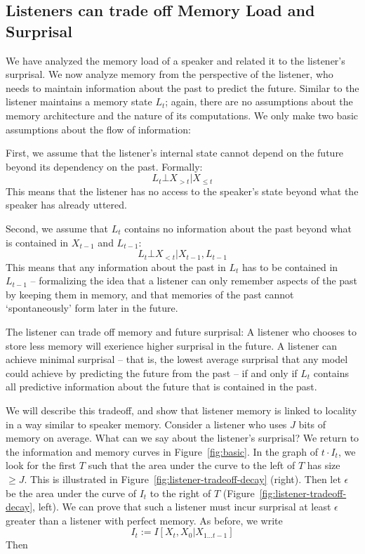 \documentclass[11pt,letterpaper]{article}
\begin{document}
\subsection{Listeners can trade off Memory Load and Surprisal}\label{sec:listener}


We have analyzed the memory load of a speaker and related it to the listener's surprisal.
We now analyze memory from the perspective of the listener, who needs to maintain information about the past to predict the future.
Similar to the listener maintains a memory state $L_t$; again, there are no assumptions about the memory architecture and the nature of its computations.
We only make two basic assumptions about the flow of information:

First, we assume that the listener's internal state cannot depend on the future beyond its dependency on the past.
Formally: 
\begin{equation}\label{eq:listener-markov-1}
L_t \bot X_{>t} | X_{\leq t}
\end{equation}
This means that the listener has no access to the speaker's state beyond what the speaker has already uttered.

Second, we assume that $L_t$ contains no information about the past beyond what is contained in $X_{t-1}$ and $L_{t-1}$:
\begin{equation}\label{eq:listener-markov-2}
L_t \bot X_{<t} | X_{t-1}, L_{t-1}
\end{equation}
This means that any information about the past in $L_t$ has to be contained in $L_{t-1}$ -- formalizing the idea that a listener can only remember aspects of the past by keeping them in memory, and that memories of the past cannot `spontaneously' form later in the future.

The listener can trade off memory and future surprisal:
A listener who chooses to store less memory will exerience higher surprisal in the future.
A listener can achieve minimal surprisal -- that is, the lowest average surprisal that any model could achieve by predicting the future from the past -- if and only if $L_t$ contains all predictive information about the future that is contained in the past.

We will describe this tradeoff, and show that listener memory is linked to locality in a way similar to speaker memory.
Consider a listener who uses $J$ bits of memory on average.
What can we say about the listener's surprisal?
We return to the information and memory curves in Figure~\ref{fig:basic}.
In the graph of $t \cdot I_t$, we look for the first $T$ such that the area under the curve to the left of $T$ has size $\geq J$.
This is illustrated in Figure~\ref{fig:listener-tradeoff-decay} (right).
Then let $\epsilon$ be the area under the curve of $I_t$ to the right of $T$ (Figure~\ref{fig:listener-tradeoff-decay}, left).
We can prove that such a listener must incur surprisal at least $\epsilon$ greater than a listener with perfect memory.
As before, we write $$I_t := I[X_t, X_0 | X_{1\dots t-1}]$$
Then
\end{document}
